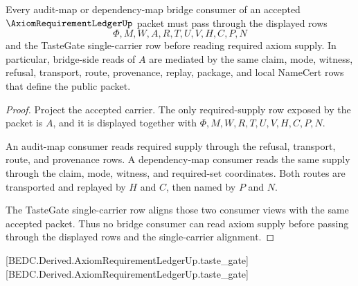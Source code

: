 \begin{theorem}
\label{thm:axiom-requirement-ledger-bridge-route}
Every audit-map or dependency-map bridge consumer of an accepted $\AxiomRequirementLedgerUp$ packet must pass through the displayed rows
$$
\Phi,M,W,A,R,T,U,V,H,C,P,N
$$
and the TasteGate single-carrier row before reading required axiom supply. In particular, bridge-side reads of $A$ are mediated by the same claim, mode, witness, refusal, transport, route, provenance, replay, package, and local NameCert rows that define the public packet.
\end{theorem}
\begin{proof}
Project the accepted carrier. The only required-supply row exposed by the packet is $A$, and it is displayed together with $\Phi,M,W,R,T,U,V,H,C,P,N$.

An audit-map consumer reads required supply through the refusal, transport, route, and provenance rows. A dependency-map consumer reads the same supply through the claim, mode, witness, and required-set coordinates. Both routes are transported and replayed by $H$ and $C$, then named by $P$ and $N$.

The TasteGate single-carrier row aligns those two consumer views with the same accepted packet. Thus no bridge consumer can read axiom supply before passing through the displayed rows and the single-carrier alignment.
\end{proof}

[BEDC.Derived.AxiomRequirementLedgerUp.taste\_gate]
[BEDC.Derived.AxiomRequirementLedgerUp.taste\_gate]

\begin{closurestatus}{\AxiomRequirementLedgerUp}
  \theoryclosure{\matureClosure}
  \formalstatus{\unformalizedV}
\end{closurestatus}
